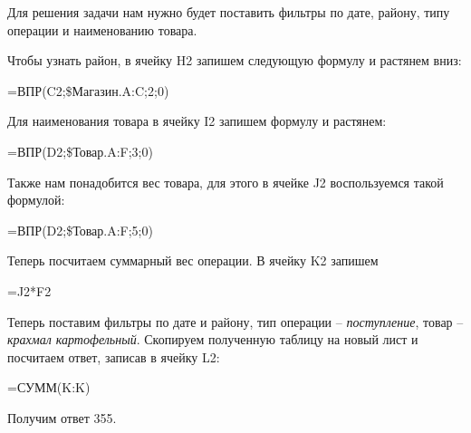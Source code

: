 \documentclass[14pt,a4paper]{article}
\begin{document}
Для решения задачи нам нужно будет поставить фильтры по дате, району,
типу операции и наименованию товара.

Чтобы узнать район, в ячейку H2 запишем следующую формулу и растянем
вниз:
\begin{center}
    =ВПР(C2;\$Магазин.A:C;2;0)
\end{center}

Для наименования товара в ячейку I2 запишем формулу и растянем:
\begin{center}
    =ВПР(D2;\$Товар.A:F;3;0)
\end{center}

Также нам понадобится вес товара, для этого в ячейке J2 воспользуемся такой
формулой:
\begin{center}
    =ВПР(D2;\$Товар.A:F;5;0)
\end{center}

Теперь посчитаем суммарный вес операции. В ячейку K2 запишем
\begin{center}
    =J2*F2
\end{center}

Теперь поставим фильтры по дате и району, тип операции -- \textit{поступление}, товар -- \textit{крахмал картофельный}. Скопируем полученную таблицу на новый лист и посчитаем ответ, записав в ячейку L2:
\begin{center}
    =СУММ(K:K)
\end{center}

Получим ответ 355.
\end{document}
